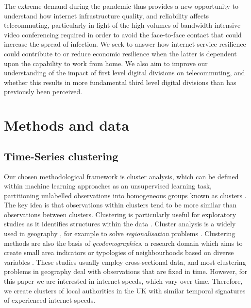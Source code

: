 \documentclass[]{interact}
\theoremstyle{plain}%
\theoremstyle{definition}
\theoremstyle{remark}
\begin{document}
The extreme demand during the pandemic thus provides a new opportunity
to understand how internet infrastructure quality, and reliability
affects telecommuting, particularly in light of the high volumes of
bandwidth-intensive video conferencing required in order to avoid the
face-to-face contact that could increase the spread of infection. We
seek to answer how internet service resilience could contribute to or
reduce economic resilience when the latter is dependent upon the
capability to work from home. We also aim to improve our understanding
of the impact of first level digital divisions on telecommuting, and
whether this results in more fundamental third level digital divisions
than has previously been perceived.

\hypertarget{sec:3}{%
\section{Methods and data}\label{sec:3}}

\hypertarget{sec:3.1}{%
\subsection{Time-Series clustering}\label{sec:3.1}}

Our chosen methodological framework is cluster analysis, which can be
defined within machine learning approaches as an unsupervised learning
task, partitioning unlabelled observations into homogeneous groups known
as clusters \citep{montero2014tsclust}. The key idea is that
observations within clusters tend to be more similar than observations
between clusters. Clustering is particularly useful for exploratory
studies as it identifies structures within the data
\citep{aghabozorgi2015time}. Cluster analysis is a widely used in
geography \citep{gordon1977classification, everitt1974cluster}, for
example to solve \emph{regionalisation} problems
\citep{niesterowicz2016}. Clustering methods are also the basis of
\emph{geodemographics}, a research domain which aims to create small
area indicators or typologies of neighbourhoods based on diverse
variables \citep{SINGLETON2009289, harris2005geodemographics}. These
studies usually employ cross-sectional data, and most clustering
problems in geography deal with observations that are fixed in time.
However, for this paper we are interested in internet speeds, which vary
over time. Therefore, we create clusters of local authorities in the UK
with similar temporal signatures of experienced internet speeds.
\end{document}
